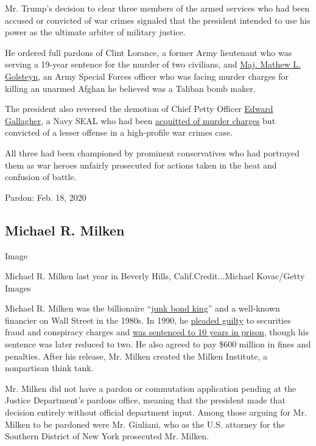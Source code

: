 Mr. Trump's decision to clear three members of the armed services who
had been accused or convicted of war crimes signaled that the president
intended to use his power as the ultimate arbiter of military justice.

He ordered full pardons of Clint Lorance, a former Army lieutenant who
was serving a 19-year sentence for the murder of two civilians, and
\href{https://www.nytimes.com/2018/12/14/us/politics/mathew-golsteyn-special-forces-murder-charges.html}{Maj.
Mathew L. Golsteyn}, an Army Special Forces officer who was facing
murder charges for killing an unarmed Afghan he believed was a Taliban
bomb maker.

The president also reversed the demotion of Chief Petty Officer
\href{https://www.nytimes.com/2019/11/21/us/navy-seal-trident-insignia.html}{Edward
Gallagher}, a Navy SEAL who had been
\href{https://www.nytimes.com/2019/07/02/us/navy-seal-trial-verdict.html}{acquitted
of murder charges} but convicted of a lesser offense in a high-profile
war crimes case.

All three had been championed by prominent conservatives who had
portrayed them as war heroes unfairly prosecuted for actions taken in
the heat and confusion of battle.

Pardon: Feb. 18, 2020

\hypertarget{michael-r-milken}{%
\subsection{Michael R. Milken}\label{michael-r-milken}}

Image

Michael R. Milken last year in Beverly Hills, Calif.Credit...Michael
Kovac/Getty Images

Michael R. Milken was the billionaire
``\href{https://www.nytimes.com/2008/04/29/business/29sorkin.html}{junk
bond king}'' and a well-known financier on Wall Street in the 1980s. In
1990, he
\href{https://www.nytimes.com/2019/10/26/business/michael-milken-trump-opportunity-zones.html}{pleaded
guilty} to securities fraud and conspiracy charges and
\href{https://www.nytimes.com/1990/11/22/business/the-milken-sentence-milken-gets-10-years-for-wall-st-crimes.html}{was
sentenced to 10 years in prison}, though his sentence was later reduced
to two. He also agreed to pay \$600 million in fines and penalties.
After his release, Mr. Milken created the Milken Institute, a
nonpartisan think tank.

Mr. Milken did not have a pardon or commutation application pending at
the Justice Department's pardons office, meaning that the president made
that decision entirely without official department input. Among those
arguing for Mr. Milken to be pardoned were Mr. Giuliani, who as the U.S.
attorney for the Southern District of New York prosecuted Mr. Milken.

